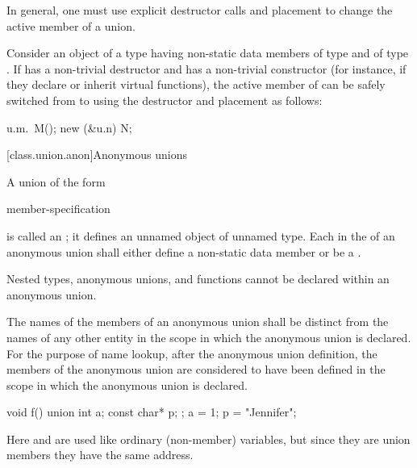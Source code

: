 \pnum
\begin{note} In general, one must use explicit destructor calls and placement
 to change the active member of a union. \end{note}
\begin{example}
Consider an object  of a  type  having non-static data members
 of type  and  of type . If  has a non-trivial
destructor and  has a non-trivial constructor (for instance, if they declare or inherit
virtual functions), the active member of  can be safely switched from  to
 using the destructor and placement  as follows:

\begin{codeblock}
u.m.~M();
new (&u.n) N;
\end{codeblock}
\end{example}

[class.union.anon]{Anonymous unions}
%

\pnum
A union of the form

\begin{ncbnftab}
 \terminal{\{} member-specification \terminal{\}} \terminal{;}
\end{ncbnftab}

is called an ; it defines an unnamed object of unnamed
type. Each  in the 
of an anonymous union shall either define a non-static data member or be a
.
\begin{note}
Nested types, anonymous unions, and functions cannot be declared within an anonymous
union.
\end{note}
The names of the members of an anonymous union shall be distinct from
the names of any other entity in the scope in which the anonymous union
is declared. For the purpose of name lookup, after the anonymous union
definition, the members of the anonymous union are considered to have
been defined in the scope in which the anonymous union is declared.
%
\begin{example}

\begin{codeblock}
void f() {
  union { int a; const char* p; };
  a = 1;
  p = "Jennifer";
}
\end{codeblock}

Here  and  are used like ordinary (non-member)
variables, but since they are union members they have the same address.
\end{example}

